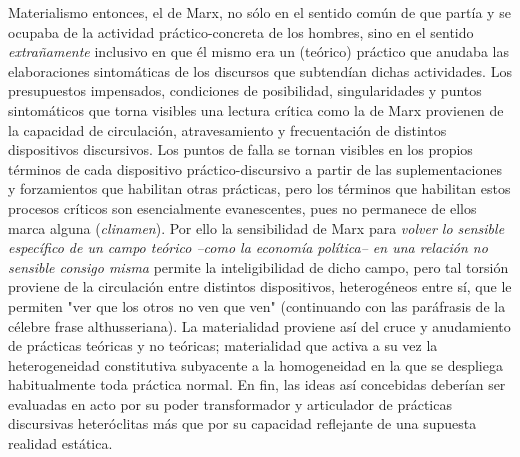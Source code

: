 \documentclass{book}
\begin{document}
Materialismo entonces, el de Marx, no sólo en el sentido común de que
partía y se ocupaba de la actividad práctico-concreta de los hombres,
sino en el sentido \emph{extrañamente} inclusivo en que él mismo era un
(teórico) práctico que anudaba las elaboraciones sintomáticas de los
discursos que subtendían dichas actividades. Los presupuestos
impensados, condiciones de posibilidad, singularidades y puntos
sintomáticos que torna visibles una lectura crítica como la de Marx
provienen de la capacidad de circulación, atravesamiento y frecuentación
de distintos dispositivos discursivos. Los puntos de falla se tornan
visibles en los propios términos de cada dispositivo práctico-discursivo
a partir de las suplementaciones y forzamientos que habilitan otras
prácticas, pero los términos que habilitan estos procesos críticos son
esencialmente evanescentes, pues no permanece de ellos marca alguna
(\emph{clinamen}). Por ello la sensibilidad de Marx para \emph{volver lo
sensible específico de un campo teórico --como la economía política-- en
una relación no sensible consigo misma} permite la inteligibilidad de
dicho campo, pero tal torsión proviene de la circulación entre distintos
dispositivos, heterogéneos entre sí, que le permiten "ver que los otros
no ven que ven" (continuando con las paráfrasis de la célebre frase
althusseriana). La materialidad proviene así del cruce y anudamiento de
prácticas teóricas y no teóricas; materialidad que activa a su vez la
heterogeneidad constitutiva subyacente a la homogeneidad en la que se
despliega habitualmente toda práctica normal. En fin, las ideas así
concebidas deberían ser evaluadas en acto por su poder transformador y
articulador de prácticas discursivas heteróclitas más que por su
capacidad reflejante de una supuesta realidad estática.
\end{document}
